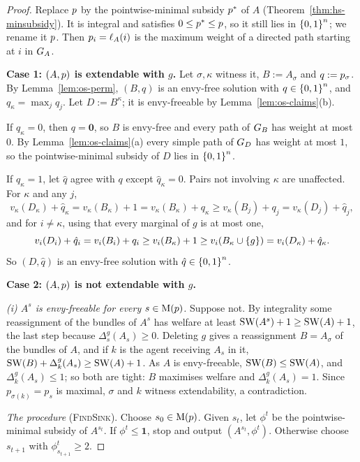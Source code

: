 \begin{proof}
Replace $p$ by the pointwise-minimal subsidy $p^{*}$ of $A$
(Theorem~\ref{thm:hs-minsubsidy}). It is integral and satisfies
$0\le p^{*}\le p$, so it still lies in $\left\{0,1\right\}^n$; we rename it
$p$. Then $p_i=\ell_{A}(i)$ is the maximum weight of a directed
path starting at $i$ in $G_{A}$.

\par\smallskip\noindent\textbf{Case 1: $(A,p)$ is extendable with $g$.}
Let $\sigma,\kappa$ witness it, $B:=A_\sigma$ and $q:=p_\sigma$. By
Lemma~\ref{lem:os-perm}, $(B,q)$ is an envy-free solution with
$q\in\left\{0,1\right\}^n$, and $q_\kappa=\max_j q_j$. Let $D:=B^\kappa$; it is
envy-freeable by Lemma~\ref{lem:os-claims}(b).

If $q_\kappa=0$, then $q=\mathbf 0$, so $B$ is envy-free and every path of
$G_{B}$ has weight at most $0$. By Lemma~\ref{lem:os-claims}(a) every
simple path of $G_{D}$ has weight at most $1$, so the pointwise-minimal
subsidy of $D$ lies in $\left\{0,1\right\}^n$.

If $q_\kappa=1$, let $\hat q$ agree with $q$ except $\hat q_\kappa=0$. Pairs
not involving $\kappa$ are unaffected. For $\kappa$ and any $j$,
\[
  v_\kappa(D_\kappa)+\hat q_\kappa=v_\kappa(B_\kappa)+1
  =v_\kappa(B_\kappa)+q_\kappa\ge v_\kappa(B_j)+q_j=v_\kappa(D_j)+\hat q_j ,
\]
and for $i\ne\kappa$, using that every marginal of $g$ is at most one,
\[
  v_i(D_i)+\hat q_i=v_i(B_i)+q_i\ge v_i(B_\kappa)+1\ge v_i(B_\kappa\cup\left\{g\right\})
  =v_i(D_\kappa)+\hat q_\kappa .
\]
So $(D,\hat q)$ is an envy-free solution with $\hat q\in\left\{0,1\right\}^n$.

\par\smallskip\noindent\textbf{Case 2: $(A,p)$ is not extendable with $g$.}

\emph{(i) $A^s$ is envy-freeable for every $s\in\mathrm{M}(p)$.} Suppose not.
By integrality some reassignment of the bundles of $A^s$ has welfare at least
$\mathrm{SW}(A^s)+1\ge\mathrm{SW}(A)+1$, the last step because $\Delta_s^g(A_s)\ge0$. Deleting
$g$ gives a reassignment $B=A_\sigma$ of the bundles of $A$, and if $k$ is the
agent receiving $A_s$ in it, $\mathrm{SW}(B)+\Delta_k^g(A_s)\ge\mathrm{SW}(A)+1$. As $A$ is
envy-freeable, $\mathrm{SW}(B)\le\mathrm{SW}(A)$, and $\Delta_k^g(A_s)\le1$; so both are tight:
$B$ maximises welfare and $\Delta_k^g(A_s)=1$. Since $p_{\sigma(k)}=p_s$ is
maximal, $\sigma$ and $k$ witness extendability, a contradiction.

\emph{The procedure} (\textsc{FindSink}). Choose $s_0\in\mathrm{M}(p)$. Given
$s_t$, let $\phi^t$ be the pointwise-minimal subsidy of $A^{s_t}$. If
$\phi^t\le\mathbf 1$, stop and output $(A^{s_t},\phi^t)$. Otherwise choose
$s_{t+1}$ with $\phi^t_{s_{t+1}}\ge2$.


\end{proof}
